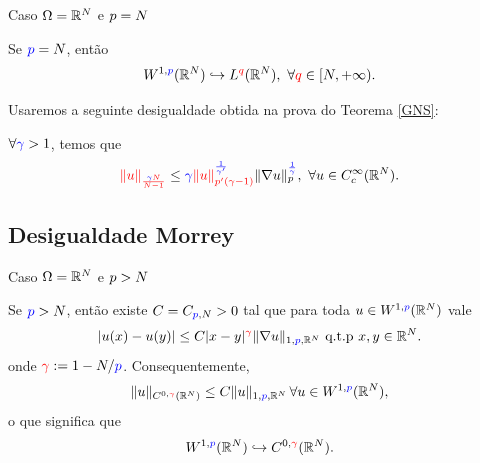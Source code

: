 \begin{frame}{Caso \(\Omega=\mathbb{R}^N\) e \(p=N\)}
\begin{corol}
Se \({\color{blue} p }=N\), então
\[
W^{1,{\color{blue}p}}(\mathbb{R}^N) \hookrightarrow L^{\color{red} q }(\mathbb{R}^N),\ \forall {\color{red} q }\in [N,+\infty).
\]
\end{corol}

\begin{exampleblock}{}
Usaremos a seguinte desigualdade obtida na prova do Teorema \eqref{GNS}:

 \(\forall{\color{blue}  \gamma }>1 \), temos que
\[
{\color{red} \lVert u\rVert_{{\frac{{\color{blue} \gamma}N}{N-1}}}}
\leq {\color{blue} \gamma }
{\color{red} \lVert u\rVert^{{\color{blue} \frac{1}{\gamma'}}}_{p'(\gamma-1)}}\lVert\nabla u\rVert_p^{{\color{blue} \frac{1}{\gamma}}},\ \forall u\in C^\infty_c(\mathbb{R}^N).
\]
\end{exampleblock}

\end{frame}

\subsection*{Desigualdade Morrey}
\begin{frame}{Caso \(\Omega=\mathbb{R}^N\) e \(p>N\)}
\begin{teo}
Se \({\color{blue} p }>N\), então existe \(C=C_{{\color{blue}p},N}>0\) tal que  para toda \( u\in W^{1,{\color{blue} p }}(\mathbb{R}^N) \) vale
\[
|u(x)-u(y)|\leq C|x-y|^{{\color{red} \gamma }} \lVert\nabla u\rVert_{1,{\color{blue} p },\mathbb{R}^N} \text{ q.t.p } x,y\in \mathbb{R}^N.
\]
onde \({\color{red} \gamma }:=1-N/{\color{blue} p }\).
Consequentemente, 
\[
\lVert u\rVert_{C^{0,{\color{red} \gamma }}(\mathbb{R}^N)}\leq C \lVert u\rVert_{1,{\color{blue}p},\mathbb{R}^N}\, \forall u\in W^{1,{\color{blue} p }}(\mathbb{R}^N),
\]
o que significa que
\[
W^{1,{\color{blue}p}}(\mathbb{R}^N) \hookrightarrow C^{0,{\color{red} \gamma }}(\mathbb{R}^N).
\]
\end{teo}

\end{frame}


